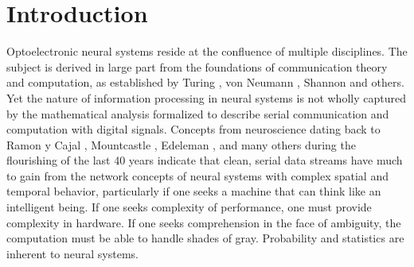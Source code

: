 \documentclass[twocolumn]{article}
\begin{document}
\vspace{3em}

\tableofcontents

\section{\label{sec:introduction}Introduction}
Optoelectronic neural systems reside at the confluence of multiple disciplines. The subject is derived in large part from the foundations of communication theory and computation, as established by Turing \cite{tu1936}, von Neumann \cite{ne1945}, Shannon \cite{sh1948} and others. Yet the nature of information processing in neural systems is not wholly captured by the mathematical analysis formalized to describe serial communication and computation with digital signals. Concepts from neuroscience dating back to Ramon y Cajal \cite{}, Mountcastle \cite{}, Edeleman \cite{}, and many others during the flourishing of the last 40 years indicate that clean, serial data streams have much to gain from the network concepts of neural systems with complex spatial and temporal behavior, particularly if one seeks a machine that can think like an intelligent being. If one seeks complexity of performance, one must provide complexity in hardware. If one seeks comprehension in the face of ambiguity, the computation must be able to handle shades of gray. Probability and statistics are inherent to neural systems. 
\end{document}
